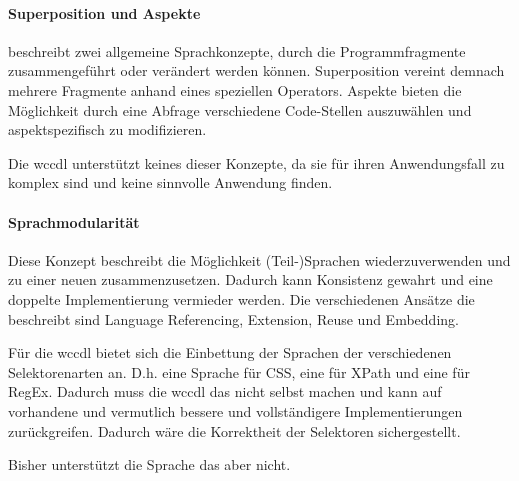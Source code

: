     \paragraph{Superposition und Aspekte}
    \citet[Kapitel 5.1.6]{voelter:DslEngineering} beschreibt zwei
    allgemeine Sprachkonzepte, durch die Programmfragmente zusammengeführt
    oder verändert werden können.
    Superposition vereint demnach mehrere Fragmente anhand eines speziellen Operators.
    Aspekte bieten die Möglichkeit durch eine Abfrage verschiedene Code-Stellen
    auszuwählen und aspektspezifisch zu modifizieren.

    Die \gls{wccdl} unterstützt keines dieser Konzepte,
    da sie für ihren Anwendungsfall zu komplex sind und keine sinnvolle Anwendung finden.

    \paragraph{Sprachmodularität}
    Diese Konzept beschreibt die Möglichkeit (Teil-)Sprachen wiederzuverwenden
    und zu einer neuen zusammenzusetzen.
    Dadurch kann Konsistenz gewahrt und eine doppelte Implementierung vermieder werden.
    Die verschiedenen Ansätze die \citet[Kapitel 4.6]{voelter:DslEngineering} beschreibt
    sind Language Referencing, Extension, Reuse und Embedding.

    Für die \gls{wccdl} bietet sich die Einbettung der Sprachen der verschiedenen Selektorenarten an.
    D.h. eine Sprache für CSS, eine für XPath und eine für RegEx.
    Dadurch muss die \gls{wccdl} das nicht selbst machen und kann auf vorhandene
    und vermutlich bessere und vollständigere Implementierungen zurückgreifen.
    Dadurch wäre die Korrektheit der Selektoren sichergestellt.

    Bisher unterstützt die Sprache das aber nicht.

